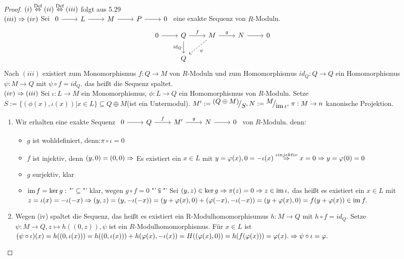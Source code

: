 \begin{proof}
	$(i) \overset{\text{Def}}{\Leftrightarrow} (ii) \overset{\text{Def}}{\Leftrightarrow} (iii) $ folgt aus 5.29 \\
	$(iii) \Rightarrow (iv) $ Sei $\begin{tikzcd}
	0  \arrow{r} & L \arrow{r} & M \arrow{r} & P \arrow{r} & 0
	\end{tikzcd} $ eine exakte Sequenz von $R$-Moduln.
	$$\begin{tikzcd}
	0\arrow{r} & Q \arrow[swap]{d}{\id_Q} \arrow{r}{f} & M \arrow[dashed]{dl}{\psi} \arrow{r}{g} & N \arrow{r} & 0\\& Q & & &
	\end{tikzcd}
	$$
	Nach $(iii)$ existiert zum Monomorphismus $f: Q \to M $ von $R$-Moduln und zum Homomorphismus $ id_Q : Q \to Q $ ein Homomorphismus $\psi: M \to Q$ mit $ \psi \circ f = id_Q $. das heißt die Sequenz spaltet. \\
	$(iv) \Rightarrow (iii) $ Sei $\iota : L \to M $ ein Monomorphismus, $ \phi: L \to Q $ ein Homomorphismus von $R$-Moduln. Setze $ S := \{ (\phi(x), \iota(x))| x \in L\} \subseteq Q \oplus M $(ist ein Untermodul). $M' := \QR{(Q \oplus M)}{S}, N := \QR{M}{\im \iota}, \, \pi: M \to n  $ kanonische Projektion. 
	\begin{enumerate}
		\item  Wir erhalten eine exakte Sequenz $\begin{tikzcd}	0  \arrow{r} & Q \arrow{r}{f} & M' \arrow{r}{g} & N \arrow{r} & 0 
		\end{tikzcd} $ von $R$-Moduln. denn: 
			\begin{itemize}
			\item $g$ ist wohldefiniert, denn:$\pi \circ \iota = 0$
			\item $f$ ist injektiv, denn $ (y,0) = (0,0)  \Rightarrow $ Es existiert ein $ x \in L $ mit $ y= \varphi(x), 0 = - \iota(x) \overset{ \iota injektiv}{\Rightarrow} x = 0 \Rightarrow y = \varphi(0) = 0 $
			\item $g$ surjektiv, klar
			\item $\operatorname{im} f = \ker g: $ "'$\subseteq$"' klar, wegen $g \circ f = 0 $ 
			"'$\subseteqq$"' Sei $(y,z) \in \ker g \Rightarrow \pi(z) = 0 \Rightarrow z \in \operatorname{im} \iota,$ das heißt es existiert ein $ x \in L $  mit $ z = \iota(x) = -\iota(-x) \Rightarrow (y,z) = (y, -\iota(-x)) = (y+\varphi(x), 0) +(\varphi(-x), -\iota(-x)) = (y+\varphi(x), 0) = f(y+ \varphi(x)) \in \operatorname{im} f.$
		\end{itemize}
	\item Wegen (iv) spaltet die Sequenz, das heißt es existiert ein R-Modulhomomorphisumus $ h: M \to Q $ mit $h \circ f = id_Q$. Setze $\psi: M \to Q, z \mapsto h((0,z)), \psi $ ist ein $R$-Modulhomomorphismus. Für $x \in L $ ist $(\psi \circ \iota)(x) = h((0,\iota(x))) = h((0, \iota(x))) + h(\varphi(x),-\iota(x)) = H((\varphi(x),0)) = h(f(\varphi(x))) = \varphi(x). \Rightarrow \psi \circ \iota = \varphi. $
	\end{enumerate}
\end{proof}